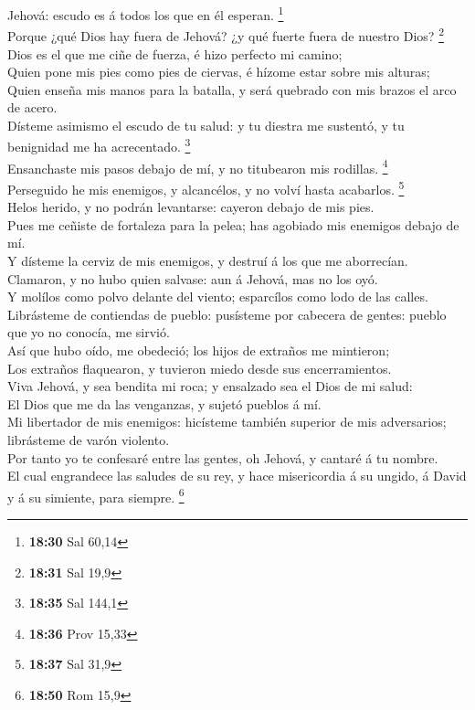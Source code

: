 Jehová: escudo es á todos los que en él esperan. \footnote{\textbf{18:30}
  Sal 60,14}\\
 Porque ¿qué Dios hay fuera de Jehová? ¿y qué fuerte fuera
de nuestro Dios? \footnote{\textbf{18:31} Sal 19,9}\\
 Dios es el que me ciñe de fuerza, é hizo perfecto mi
camino;\\
 Quien pone mis pies como pies de ciervas, é hízome estar
sobre mis alturas;\\
 Quien enseña mis manos para la batalla, y será quebrado
con mis brazos el arco de acero.\\
 Dísteme asimismo el escudo de tu salud: y tu diestra me
sustentó, y tu benignidad me ha acrecentado. \footnote{\textbf{18:35}
  Sal 144,1}\\
 Ensanchaste mis pasos debajo de mí, y no titubearon mis
rodillas. \footnote{\textbf{18:36} Prov 15,33}\\
 Perseguido he mis enemigos, y alcancélos, y no volví hasta
acabarlos. \footnote{\textbf{18:37} Sal 31,9}\\
 Helos herido, y no podrán levantarse: cayeron debajo de
mis pies.\\
 Pues me ceñiste de fortaleza para la pelea; has agobiado
mis enemigos debajo de mí.\\
 Y dísteme la cerviz de mis enemigos, y destruí á los que
me aborrecían.\\
 Clamaron, y no hubo quien salvase: aun á Jehová, mas no
los oyó.\\
 Y molílos como polvo delante del viento; esparcílos como
lodo de las calles.\\
 Librásteme de contiendas de pueblo: pusísteme por cabecera
de gentes: pueblo que yo no conocía, me sirvió.\\
 Así que hubo oído, me obedeció; los hijos de extraños me
mintieron;\\
 Los extraños flaquearon, y tuvieron miedo desde sus
encerramientos.\\
 Viva Jehová, y sea bendita mi roca; y ensalzado sea el
Dios de mi salud:\\
 El Dios que me da las venganzas, y sujetó pueblos á mí.\\
 Mi libertador de mis enemigos: hicísteme también superior
de mis adversarios; librásteme de varón violento.\\
 Por tanto yo te confesaré entre las gentes, oh Jehová, y
cantaré á tu nombre.\\
 El cual engrandece las saludes de su rey, y hace
misericordia á su ungido, á David y á su simiente, para siempre.
\footnote{\textbf{18:50} Rom 15,9}

